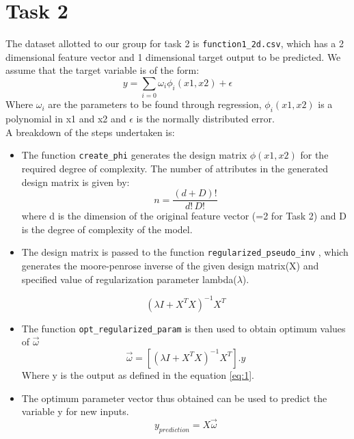 \documentclass[12pt,a4paper]{article}
\def\tt#1{\texttt{#1}}
\begin{document}
\section{Task 2}

The dataset allotted to our group for task 2 is \tt{function1\_2d.csv}, which has a 2 dimensional feature vector and 1 dimensional target output to be predicted. We assume that the target variable is of the form:
\begin{equation}\label{eq:1}
    y=\sum_{i=0}\omega _{i}\phi_{i}(x1,x2)  +\epsilon 
\end{equation}
Where $\omega_{i}$ are the parameters to be found through regression, $\phi_{i}(x1,x2)$ is a polynomial in x1 and x2 and $\epsilon$ is the normally distributed error. 
\\ A breakdown of the steps undertaken is:

\begin{itemize}
    \item The function \tt{create\_phi} generates the design matrix $\phi(x1,x2)$ for the required degree of complexity.
    The number of attributes in the generated design matrix is given by:
    \begin{equation}
        n=\frac{(d+D)!}{d!\,D!}
    \end{equation}
    where d is the dimension of the original feature vector (=2 for Task 2) and D is the degree of complexity of the model. 
    \item The design matrix is passed to the function \tt{regularized\_pseudo\_inv} , which generates the moore-penrose inverse of the given design matrix(X) and specified value of regularization parameter lambda($\lambda$).
    
    \begin{equation}
         (\lambda I+X^{T}X)^{-1}X^{T}
    \end{equation}
    
    \item The function \tt{opt\_regularized\_param} is then used to obtain optimum values of $\vec{\omega}$
    \begin{equation}
        \vec{\omega} = [(\lambda I+X^{T}X)^{-1}X^{T}].y
    \end{equation}
    Where y is the output as defined in the equation \ref{eq:1}.
    
    \item The optimum parameter vector thus obtained can be used to predict the variable y for new inputs. 
    \begin{equation}
        y_{prediction}=X\vec{\omega}
    \end{equation}
\end{itemize}
\end{document}
